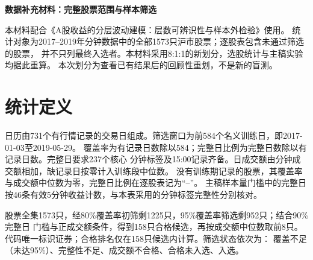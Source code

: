 \documentclass[10pt,a4paper]{article}
\begin{document}
\begin{center}\Large\bfseries 数据补充材料：完整股票范围与样本筛选\end{center}
\noindent 本材料配合《A股收益的分层波动建模：层数可辨识性与样本外检验》使用。
统计对象为2017--2019年分钟数据中的全部1573只沪市股票；逐股表包含未通过筛选的股票，
并不只列最终入选者。本材料采用8:1:1的新划分，选股统计与主稿实验均据此重算。
本次划分为查看已有结果后的回顾性重划，不是新的盲测。

\section*{统计定义}
日历由731个有行情记录的交易日组成。筛选窗口为前584个名义训练日，即2017-01-03至2019-05-29。
覆盖率为有记录日数除以584；完整日比例为完整日数除以有记录日数。完整日要求237个核心
分钟标签及15:00记录齐备。日成交额由分钟成交额相加，缺记录日按零计入训练段中位数。
没有训练期记录的股票，其覆盖率与成交额中位数为零，完整日比例在逐股表记为“--”。
主稿样本量门槛中的完整日按46条有效5分钟收益计数，与本表采用的分钟标签完整性分别核对。

股票全集1573只，经80\%覆盖率初筛剩1225只，95\%覆盖率筛选剩952只；结合90\%完整日
门槛与正成交额条件，得到158只合格候选，再按成交额中位数取前8只。
代码唯一标识证券；合格排名仅在158只候选内计算。筛选状态依次为：
覆盖不足（未达95\%）、完整性不足、成交额不合格、合格未入选、入选。
\end{document}
